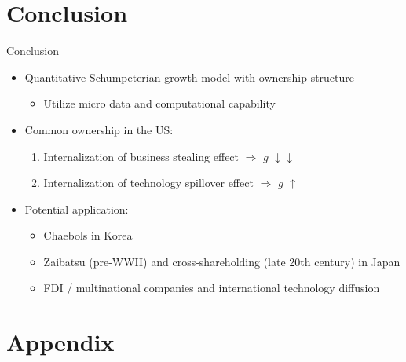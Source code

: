 \documentclass[
  10pt, %
  aspectratio=169,  %
  handout
]{beamer}
\theoremstyle{plain}
\begin{document}
\section{Conclusion}
\begin{frame}{Conclusion}
  \begin{itemize}
    \item Quantitative Schumpeterian growth model with ownership structure
          \begin{itemize}
            \item Utilize micro data and computational capability
          \end{itemize}
          \medskip{}
    \item Common ownership in the US:
          \begin{enumerate}
            \item Internalization of business stealing effect $\Longrightarrow$ $g$ $\downarrow$$\downarrow$
            \item Internalization of technology spillover effect $\Longrightarrow$ $g$ $\uparrow$
          \end{enumerate}
          \medskip{}
    \item Potential application:
          \begin{itemize}
            \item Chaebols in Korea
            \item Zaibatsu (pre-WWII) and cross-shareholding (late 20th century) in Japan
            \item FDI / multinational companies and international technology diffusion
          \end{itemize}
  \end{itemize}
\end{frame}

\appendix

\section{Appendix}
\end{document}
